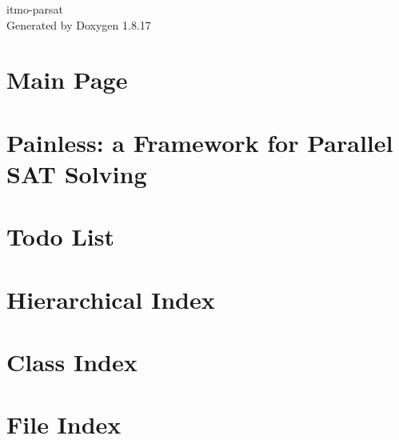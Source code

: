 \let\mypdfximage\pdfximage\def\pdfximage{\immediate\mypdfximage}\documentclass[twoside]{book}
\newcommand{\+}{\discretionary{\mbox{\scriptsize$\hookleftarrow$}}{}{}}
\newcommand{\clearemptydoublepage}{%
  \newpage{\pagestyle{empty}\cleardoublepage}%
}
\begin{document}
\hypersetup{pageanchor=false,
             bookmarksnumbered=true,
             pdfencoding=unicode
            }
\begin{titlepage}
\vspace*{7cm}
\begin{center}%
{\Large itmo-\/parsat }\\
\vspace*{1cm}
{\large Generated by Doxygen 1.8.17}\\
\end{center}
\end{titlepage}
\clearemptydoublepage
{}
\tableofcontents
\clearemptydoublepage
{}
\hypersetup{pageanchor=true}

\chapter{Main Page}
\label{index}\hypertarget{index}{}
\chapter{Painless\+: a Framework for Parallel S\+AT Solving}
\label{md_core_sat_native_painless_README}

\chapter{Todo List}
\label{todo}

\chapter{Hierarchical Index}

\chapter{Class Index}

\chapter{File Index}

\end{document}

